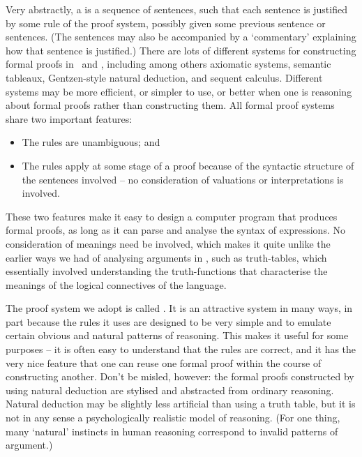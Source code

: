 Very abstractly, a  is a sequence of sentences, such that each sentence is justified by some rule of the proof system, possibly given some previous sentence or sentences. (The sentences may also be accompanied by a `commentary' explaining how that sentence is justified.) There are lots of different systems for constructing formal proofs in \TFL\ and \FOL, including among others axiomatic systems, semantic tableaux, Gentzen-style natural deduction, and sequent calculus. Different systems may be more efficient, or simpler to use, or better when one is reasoning about formal proofs rather than constructing them. 
 All formal proof systems share two important features: \begin{itemize}
	\item The rules are unambiguous; and
	\item The rules apply at some stage of a proof because of the syntactic structure of the sentences involved – no consideration of valuations or interpretations is involved.
\end{itemize} These two features make it easy to design a computer program that produces formal proofs, as long as it can parse and analyse the syntax of expressions. No consideration of meanings need be involved, which makes it quite unlike the earlier ways we had of analysing arguments in \TFL, such as truth-tables, which essentially involved understanding the truth-functions that characterise the meanings of the logical connectives of the language.

The proof system we adopt is called . It is an attractive system in many ways, in part because the rules it uses are designed to be very simple and to emulate certain obvious and natural patterns of reasoning. This makes it useful for some purposes – it is often easy to understand that the rules are correct, and it has the very nice feature that one can reuse one formal proof within the course of constructing another. Don't be misled, however: the formal proofs constructed by using natural deduction are stylised and abstracted from ordinary reasoning. Natural deduction may be slightly less artificial than using a truth table, but it is not in any sense a psychologically realistic model of reasoning. (For one thing, many `natural' instincts in human reasoning correspond to invalid patterns of argument.)

